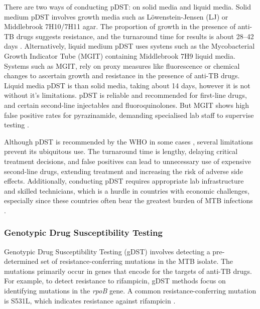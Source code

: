 There are two ways of conducting pDST: on solid media and liquid media. Solid medium pDST involves growth media such as Löwenstein-Jensen (LJ) or Middlebrook 7H10/7H11 agar. The proportion of growth in the presence of anti-TB drugs suggests resistance, and the turnaround time for results is about 28–42 days \cite{who2022}. Alternatively, liquid medium pDST uses systens such as the Mycobacterial Growth Indicator Tube (MGIT) containing Middlebrook 7H9 liquid media. Systems such as MGIT, rely on proxy measures like fluorescence or chemical changes to ascertain growth and resistance in the presence of anti-TB drugs\cite{Yusoof2022}. Liquid media pDST is than solid media, taking about 14 days, however it is not without it's limitations. pDST is reliable and recommended for first-line drugs, and certain second-line injectables and fluoroquinolones. But MGIT shows high false positive rates for pyrazinamide, demanding specialised lab staff to supervise testing \cite{who2018tb}. 

Although pDST is recommended by the WHO in some cases \cite{whoguide2022}, several limitations prevent its ubiquitous use. The turnaround time is lengthy, delaying critical treatment decisions, and false positives can lead to unnecessary use of expensive second-line drugs, extending treatment and increasing the risk of adverse side effects. Additionally, conducting pDST requires appropriate lab infrastructure and skilled technicians, which is a hurdle in countries with economic challenges, especially since these countries often bear the greatest burden of MTB infections \cite{who_world_bank_2022}.

\subsubsection{Genotypic Drug Susceptibility Testing}

Genotypic Drug Susceptibility Testing (gDST) involves detecting a pre-determined set of resistance-conferring mutations in the MTB isolate. The mutations primarily occur in genes that encode for the targets of anti-TB drugs. For example, to detect resistance to rifampicin, gDST methods focus on identifying mutations in the \textit{rpoB} gene. A common resistance-conferring mutation is S531L, which indicates resistance against rifampicin \cite{sinha2020detection}. 

